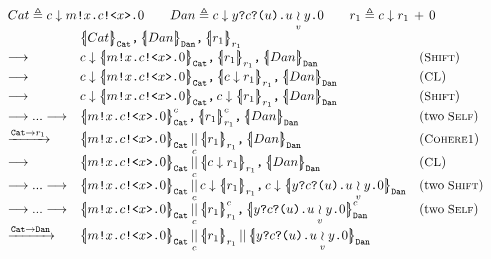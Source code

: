 \begin{figure}[t]
{\footnotesize
\[
\begin{array}{l}
\begin{array}{l}
Cat\triangleq\down{c}{\send{m}{x}{\csend{c}{x}{0}}}
\qquad
Dan\triangleq\down{c}{\rev{y}{\crev{c}{u}{\mer{u}{v}{y}{0}}}}
\qquad
r_1\triangleq \parp{\down{c}r_1}{0}
\end{array}\\
\begin{array}{lll}
&
\pard{\pard{\qcellb{Cat}{\cn{Cat}}}
{\qcellb{Dan}{\cn{Dan}}}}
{\qcellb{r_1}{r_1}}
&
\\[0.3em]
\longrightarrow
&
\pard{\pard{\down{c}\qcellb{\send{m}{x}{\csend{c}{x}{0}}}{\cn{Cat}}}
{\qcellb{r_1}{r_1}}}
{\qcellb{Dan}{\cn{Dan}}}
&
(\rulelab{Shift})
\\[0.3em]
\longrightarrow
&
\pard{\pard{\down{c}\qcellb{\send{m}{x}{\csend{c}{x}{0}}}{\cn{Cat}}}
{\qcellb{\down{c}r_1}{r_1}}}
{\qcellb{Dan}{\cn{Dan}}}
&
(\rulelab{CL})
\\[0.3em]
\longrightarrow
&
\pard{\pard{\down{c}\qcellb{\send{m}{x}{\csend{c}{x}{0}}}{\cn{Cat}}}
{\down{c}\qcellb{r_1}{r_1}}}
{\qcellb{Dan}{\cn{Dan}}}
&
(\rulelab{Shift})
\\[0.3em]
\longrightarrow...\longrightarrow
&
\pard{\pard{\pcellb{\send{m}{x}{\csend{c}{x}{0}}}{c}{\cn{Cat}}}
{\pcellb{r_1}{c}{r_1}}}
{\qcellb{Dan}{\cn{Dan}}}
&
(\text{two}\;\rulelab{Self})
\\[0.3em]
\xrightarrow{\cn{Cat}\to r_1}
&
\pard{\parll{\qcellb{\send{m}{x}{\csend{c}{x}{0}}}{\cn{Cat}}}{c}
{\qcellb{r_1}{r_1}}}
{\qcellb{Dan}{\cn{Dan}}}
&
(\rulelab{Cohere1})
\\[0.3em]
\longrightarrow
&
\pard{\parll{\qcellb{\send{m}{x}{\csend{c}{x}{0}}}{\cn{Cat}}}{c}
{\qcellb{\down{c}r_1}{r_1}}}
{\qcellb{Dan}{\cn{Dan}}}
&
(\rulelab{CL})
\\[0.3em]
\longrightarrow...\longrightarrow
&
\pard{\parll{\qcellb{\send{m}{x}{\csend{c}{x}{0}}}{\cn{Cat}}}{c}
{\down{c}\qcellb{r_1}{r_1}}}
{\down{c}\qcellb{\rev{y}{\crev{c}{u}{\mer{u}{v}{y}{0}}}}{\cn{Dan}}}
&
(\text{two}\;\rulelab{Shift})
\\[0.3em]
\longrightarrow...\longrightarrow
&
\pard{\parll{\qcellb{\send{m}{x}{\csend{c}{x}{0}}}{\cn{Cat}}}{c}
{\pcellb{r_1}{c}{r_1}}}
{\pcellb{\rev{y}{\crev{c}{u}{\mer{u}{v}{y}{0}}}}{c}{\cn{Dan}}}
&
(\text{two}\;\rulelab{Self})
\\[0.3em]
\xrightarrow{\cn{Cat}\to \cn{Dan}}
&
\parl{\parll{\qcellb{\send{m}{x}{\csend{c}{x}{0}}}{\cn{Cat}}}{c}
{\qcellb{r_1}{r_1}}}
{\qcellb{\rev{y}{\crev{c}{u}{\mer{u}{v}{y}{0}}}}{\cn{Dan}}}

\end{array}
\end{array}\]}
\end{figure}

